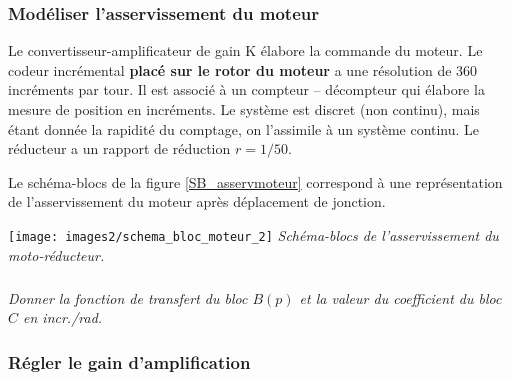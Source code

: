 \documentclass[10pt,fleqn]{article} %
\begin{document}
%
%
%	
%
\subsubsection*{Modéliser l'asservissement du moteur\\}

Le convertisseur-amplificateur de gain K élabore la commande du moteur. Le codeur incrémental \textbf{placé sur le rotor du moteur} a une résolution de 360 incréments par tour. Il est associé à un compteur -- décompteur qui élabore la mesure de position en incréments. Le système est discret (non continu), mais étant donnée la rapidité du comptage, on l’assimile à un système continu. Le réducteur a un rapport de réduction $r=1/50$.

Le schéma-blocs de la figure \ref{SB_asservmoteur} correspond à une représentation de l'asservissement du moteur après déplacement de jonction.

\begin{center}%
\texttt{[image: images2/schema\_bloc\_moteur\_2]}
\textit{Schéma-blocs de l'asservissement du moto-réducteur.}
\label{SB_asservmoteur}
%

\end{center}



\subparagraph{}\textit{Donner la fonction de transfert du bloc $B(p)$ et la valeur du coefficient du bloc $C$ en incr./rad.} 

\subsubsection*{Régler le gain d'amplification}
\end{document}
